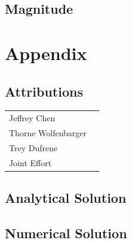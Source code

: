 \documentclass[12pt]{report}
\begin{document}
\begin{flushleft}
\subsection{Magnitude}

\section{Appendix} \label{appendix}
\subsection{Attributions}
\onehalfspacing
\begin{tabular}{ll}
Jeffrey Chen & \\
Thorne Wolfenbarger &\\
Trey Dufrene & \\
Joint Effort &
\end{tabular}
\singlespacing

\newpage
\subsection{Analytical Solution}

\newpage
\subsection{Numerical Solution} \label{appendix:numerical}
% 

\end{flushleft}
\end{document}
